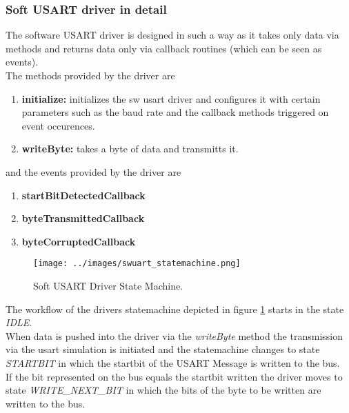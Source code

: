\subsubsection{Soft USART driver in detail}
\label{sec:bus:design:layer1:interface:swuart}

The software USART driver is designed in such a way as it takes only data via methods and returns data only via callback routines (which can be seen as events).\\

The methods provided by the driver are

\begin{enumerate}
 \item \textbf{initialize: } initializes the sw usart driver and configures it with certain parameters such as the baud rate and the callback methods triggered on event occurences.
 \item \textbf{writeByte: } takes a byte of data and transmitts it.
\end{enumerate}

and the events provided by the driver are

\begin{enumerate}
 \item \textbf{startBitDetectedCallback}
 \item \textbf{byteTransmittedCallback}
 \item \textbf{byteCorruptedCallback}
\end{enumerate}

\begin{figure}[h]
\centering
\texttt{[image: ../images/swuart\_statemachine.png]}
\caption{Soft USART Driver State Machine.}
\label{fig:bus:design:layer1:interface:swuart}
\end{figure}

The workflow of the drivers statemachine depicted in figure \ref{fig:bus:design:layer1:interface:swuart} starts in the state \textit{IDLE}.\\

When data is pushed into the driver via the \textit{writeByte} method the transmission via the usart simulation is initiated and the statemachine changes to state \textit{STARTBIT} in which the startbit of the USART Message is written to the bus.\\

If the bit represented on the bus equals the startbit written the driver moves to state \textit{WRITE\_NEXT\_BIT} in which the bits of the byte to be written are written to the bus.\\

